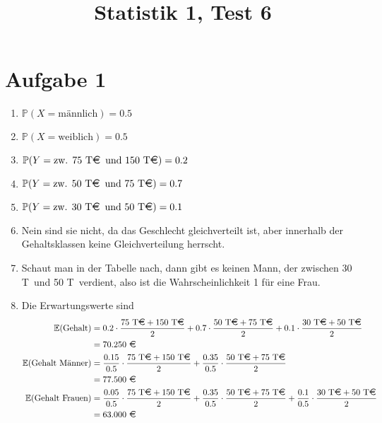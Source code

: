 \documentclass{article}
\title{\textbf{Statistik 1, Test 6}}
\date{}
\newcommand{\E}{\mathbb{E}}
\begin{document}
	\maketitle
	
	\section*{Aufgabe 1}
	\begin{enumerate}[label=(\alph*)]
		\item $\mathbb{P}(X=\text{männlich}) = 0.5$
		\item $\mathbb{P}(X=\text{weiblich}) = 0.5$
		\item $\mathbb{P}(Y=\text{zw. 75 T\EUR\, und 150 T\EUR}) = 0.2$
		\item $\mathbb{P}(Y=\text{zw. 50 T\EUR\, und 75 T\EUR}) = 0.7$
		\item $\mathbb{P}(Y=\text{zw. 30 T\EUR\, und 50 T\EUR}) = 0.1$
		\item Nein sind sie nicht, da das Geschlecht gleichverteilt ist, aber innerhalb der Gehaltsklassen keine Gleichverteilung herrscht.
		\item Schaut man in der Tabelle nach, dann gibt es keinen Mann, der zwischen 30 T\EUR\, und 50 T\EUR\, verdient, also ist die Wahrscheinlichkeit 1 für eine Frau.
		\item Die Erwartungswerte sind
		\begin{align}
			\E(\text{Gehalt}) &= 0.2\cdot \frac{75\text{ T\EUR} + 150\text{ T\EUR}}{2} + 0.7\cdot \frac{50\text{ T\EUR} + 75\text{ T\EUR}}{2} + 0.1\cdot \frac{30\text{ T\EUR} + 50\text{ T\EUR}}{2} \notag \\
			&= 70.250 \text{ \EUR} \notag \\
			\E(\text{Gehalt Männer}) &= \frac{0.15}{0.5}\cdot \frac{75\text{ T\EUR} + 150\text{ T\EUR}}{2} + \frac{0.35}{0.5}\cdot \frac{50\text{ T\EUR} + 75\text{ T\EUR}}{2} \notag \\
			&= 77.500 \text{ \EUR} \notag \\
			\E(\text{Gehalt Frauen}) &= \frac{0.05}{0.5}\cdot \frac{75\text{ T\EUR} + 150\text{ T\EUR}}{2} + \frac{0.35}{0.5}\cdot \frac{50\text{ T\EUR} + 75\text{ T\EUR}}{2} + \frac{0.1}{0.5}\cdot \frac{30\text{ T\EUR} + 50\text{ T\EUR}}{2} \notag \\
			&= 63.000 \text{ \EUR} \notag
		\end{align}
	\end{enumerate}
\end{document}
